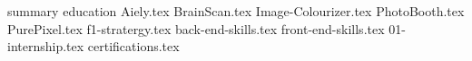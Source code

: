 \documentclass{cv_template}
\begin{document}
{summary}
{education}
{Aiely.tex}
{BrainScan.tex}
{Image-Colourizer.tex}
{PhotoBooth.tex}
{PurePixel.tex}
{f1-stratergy.tex}
{back-end-skills.tex}
{front-end-skills.tex}
{01-internship.tex}
{certifications.tex}
\end{document}
